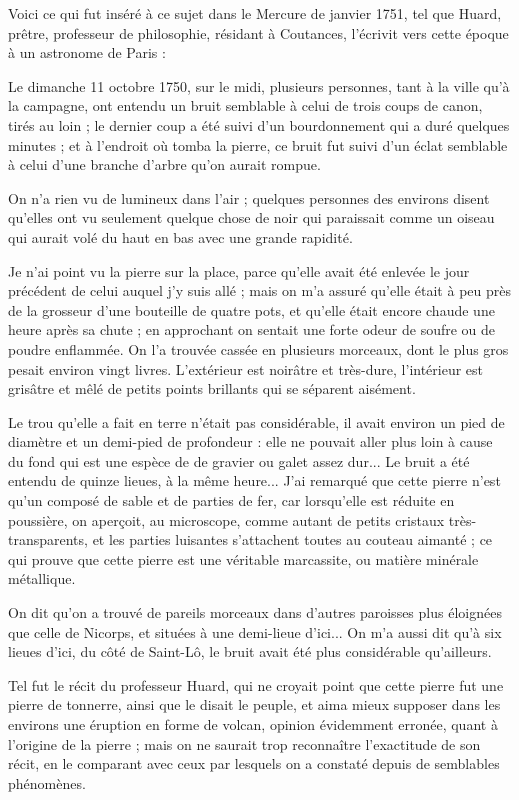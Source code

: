 \documentclass[a4paper, 12pt, oneside, french]{article}
\begin{document}
Voici ce qui fut inséré à ce sujet dans le Mercure de janvier 1751, tel que Huard, prêtre, professeur de philosophie, résidant à Coutances, l'écrivit vers cette époque à un astronome de Paris :

\og Le dimanche 11 octobre 1750, sur le midi, plusieurs personnes, tant à la ville qu'à la campagne, ont entendu un bruit semblable à celui de trois coups de canon, tirés au loin ; le dernier coup a été suivi d'un bourdonnement qui a duré quelques minutes ; et à l'endroit où tomba la pierre, ce bruit fut suivi d'un éclat semblable à celui d'une branche d'arbre qu'on aurait rompue. \fg

\og On n'a rien vu de lumineux dans l'air ; quelques personnes des environs disent qu'elles ont vu seulement quelque chose de noir qui paraissait comme un oiseau qui aurait volé du haut en bas avec une grande rapidité. \fg

\og Je n'ai point vu la pierre sur la place, parce qu'elle avait été enlevée le jour précédent de celui auquel j'y suis allé ; mais on m'a assuré qu'elle était à peu près de la grosseur d'une bouteille de quatre pots, et qu'elle était encore chaude une heure après sa chute ; en approchant on sentait une forte odeur de soufre ou de poudre enflammée. On l'a trouvée cassée en plusieurs morceaux, dont le plus gros pesait environ vingt livres. L'extérieur est noirâtre et très-dure, l'intérieur est grisâtre et mêlé de petits points brillants qui se séparent aisément. \fg

\og Le trou qu'elle a fait en terre n'était pas considérable, il avait environ un pied de diamètre et un demi-pied de profondeur : elle ne pouvait aller plus loin à cause du fond qui est une espèce de de gravier ou galet assez dur... Le bruit a été entendu de quinze lieues, à la même heure... J'ai remarqué que cette pierre n'est qu'un composé de sable et de parties de fer, car lorsqu'elle est réduite en poussière, on aperçoit, au microscope, comme autant de petits cristaux très-transparents, et les parties luisantes s'attachent toutes au couteau aimanté ; ce qui prouve que cette pierre est une véritable marcassite, ou matière minérale métallique. \fg

\og On dit qu'on a trouvé de pareils morceaux dans d'autres paroisses plus éloignées que celle de Nicorps, et situées à une demi-lieue d'ici... On m'a aussi dit qu'à six lieues d'ici, du côté de Saint-Lô, le bruit avait été plus considérable qu'ailleurs. \fg

Tel fut le récit du professeur Huard, qui ne croyait point que cette pierre fut une pierre de tonnerre, ainsi que le disait le peuple, et aima mieux supposer dans les environs une éruption en forme de volcan, opinion évidemment erronée, quant à l'origine de la pierre ; mais on ne saurait trop reconnaître l'exactitude de son récit, en le comparant avec ceux par lesquels on a constaté depuis de semblables phénomènes.
\end{document}
